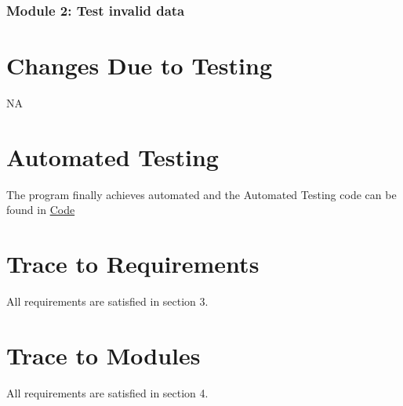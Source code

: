 \documentclass[12pt, titlepage]{article}
\begin{document}
\subsubsection{Module 2: Test invalid data}


\newpage

\section{Changes Due to Testing} \label{utest}
NA
\section{Automated Testing} \label{utest}
The program finally achieves automated and the Automated Testing code can be found in \href{https://github.com/KarenKarenWang/cas741_project1/tree/main/docs/Design/code}{Code}
 
\section{Trace to Requirements} \label{utest}
All requirements are satisfied in section 3.
\section{Trace to Modules} \label{utest}
All requirements are satisfied in section 4.
\newpage



\end{document}
